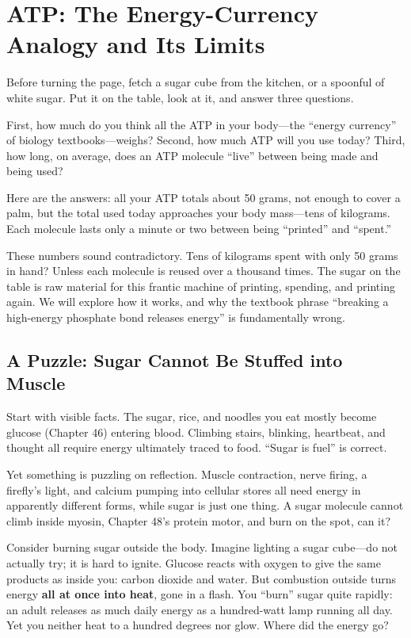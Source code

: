 \chapter{ATP: The Energy-Currency Analogy and Its Limits}

\begin{kaichang}
Before turning the page, fetch a sugar cube from the kitchen, or a spoonful of white sugar. Put it on the table, look at it, and answer three questions.

First, how much do you think all the ATP in your body---the ``energy currency'' of biology textbooks---weighs? Second, how much ATP will you use today? Third, how long, on average, does an ATP molecule ``live'' between being made and being used?

Here are the answers: all your ATP totals about 50 grams, not enough to cover a palm, but the total used today approaches your body mass---tens of kilograms. Each molecule lasts only a minute or two between being ``printed'' and ``spent.''

These numbers sound contradictory. Tens of kilograms spent with only 50 grams in hand? Unless each molecule is reused over a thousand times. The sugar on the table is raw material for this frantic machine of printing, spending, and printing again. We will explore how it works, and why the textbook phrase ``breaking a high-energy phosphate bond releases energy'' is fundamentally wrong.
\end{kaichang}

\section{A Puzzle: Sugar Cannot Be Stuffed into Muscle}

Start with visible facts. The sugar, rice, and noodles you eat mostly become glucose (Chapter 46) entering blood. Climbing stairs, blinking, heartbeat, and thought all require energy ultimately traced to food. ``Sugar is fuel'' is correct.

Yet something is puzzling on reflection. Muscle contraction, nerve firing, a firefly's light, and calcium pumping into cellular stores all need energy in apparently different forms, while sugar is just one thing. A sugar molecule cannot climb inside myosin, Chapter 48's protein motor, and burn on the spot, can it?

Consider burning sugar outside the body. Imagine lighting a sugar cube---do not actually try; it is hard to ignite. Glucose reacts with oxygen to give the same products as inside you: carbon dioxide and water. But combustion outside turns energy \textbf{all at once into heat}, gone in a flash. You ``burn'' sugar quite rapidly: an adult releases as much daily energy as a hundred-watt lamp running all day. Yet you neither heat to a hundred degrees nor glow. Where did the energy go?

